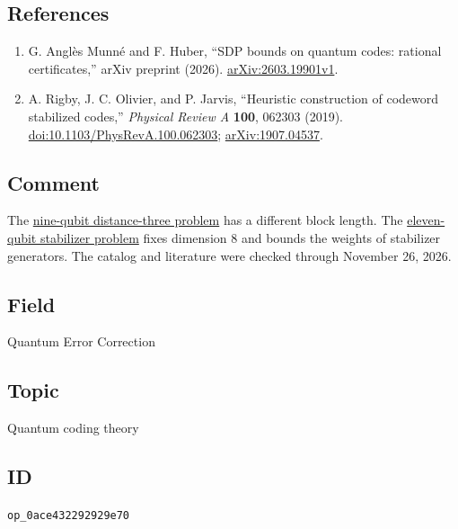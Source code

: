\subsection*{References}

\begin{enumerate}[label={},leftmargin=4.8em,labelsep=0.5em]
  \footnotesize
  \item[\textup{[AMH26]}]\label{ref:ec33-amh}
  G. Anglès Munné and F. Huber, ``SDP bounds on quantum codes: rational certificates,'' arXiv preprint (2026). \href{https://arxiv.org/abs/2603.19901v1}{arXiv:2603.19901v1}.

  \item[\textup{[ROJ19]}]\label{ref:ec33-roj}
  A. Rigby, J. C. Olivier, and P. Jarvis, ``Heuristic construction of codeword stabilized codes,'' \emph{Physical Review A} \textbf{100}, 062303 (2019). \href{https://doi.org/10.1103/PhysRevA.100.062303}{doi:10.1103/PhysRevA.100.062303}; \href{https://arxiv.org/abs/1907.04537}{arXiv:1907.04537}.
\end{enumerate}

\subsection*{Comment}

The \href{https://qiqc-op.com/problem/op_0d6ac674da115857/}{nine-qubit distance-three problem} has a different block length. The \href{https://qiqc-op.com/problem/op_458e9e86ccbddccb/}{eleven-qubit stabilizer problem} fixes dimension $8$ and bounds the weights of stabilizer generators. The catalog and literature were checked through November 26, 2026.

\subsection*{Field}

Quantum Error Correction

\subsection*{Topic}

Quantum coding theory

\subsection*{ID}

\texttt{op\_0ace432292929e70}
